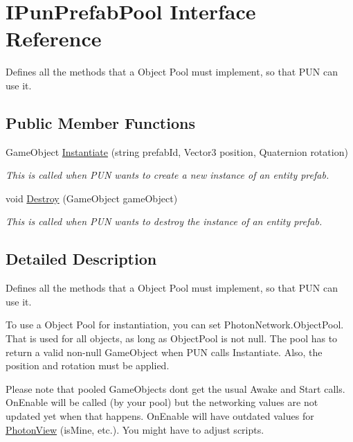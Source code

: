 \hypertarget{interface_i_pun_prefab_pool}{}\section{I\+Pun\+Prefab\+Pool Interface Reference}
\label{interface_i_pun_prefab_pool}


Defines all the methods that a Object Pool must implement, so that P\+UN can use it.  


\subsection*{Public Member Functions}
\begin{DoxyCompactItemize}
\item 
Game\+Object \hyperlink{interface_i_pun_prefab_pool_a7faad9f73d3ef1574d3bf512f5d870ea}{Instantiate} (string prefab\+Id, Vector3 position, Quaternion rotation)
\begin{DoxyCompactList}\small\item\em This is called when P\+UN wants to create a new instance of an entity prefab. \end{DoxyCompactList}\item 
void \hyperlink{interface_i_pun_prefab_pool_a7e4be9281d4a5d2474134e54ef766aa0}{Destroy} (Game\+Object game\+Object)
\begin{DoxyCompactList}\small\item\em This is called when P\+UN wants to destroy the instance of an entity prefab. \end{DoxyCompactList}\end{DoxyCompactItemize}


\subsection{Detailed Description}
Defines all the methods that a Object Pool must implement, so that P\+UN can use it. 

To use a Object Pool for instantiation, you can set Photon\+Network.\+Object\+Pool. That is used for all objects, as long as Object\+Pool is not null. The pool has to return a valid non-\/null Game\+Object when P\+UN calls Instantiate. Also, the position and rotation must be applied.

Please note that pooled Game\+Objects don\textquotesingle{}t get the usual Awake and Start calls. On\+Enable will be called (by your pool) but the networking values are not updated yet when that happens. On\+Enable will have outdated values for \hyperlink{class_photon_view}{Photon\+View} (is\+Mine, etc.). You might have to adjust scripts.

